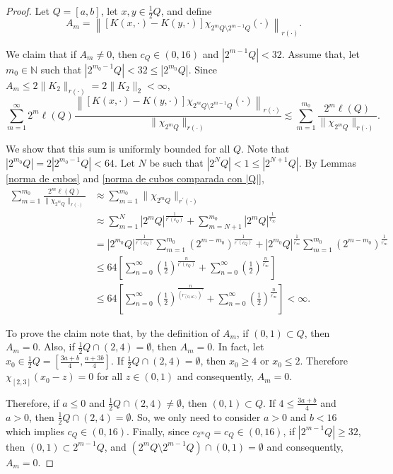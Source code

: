 \documentclass[a4paper,11pt,reqno]{amsart}
\theoremstyle{plain}
\numberwithin{equation}{section}
\theoremstyle{definition}
\begin{document}
\begin{proof}
	Let $Q=[a,b]$, let $x,y\in\frac{1}{2}Q$, and define $$A_m=\left\|\left[K(x,\cdot)-K(y,\cdot)\right]\chi_{2^mQ\setminus2^{m-1}Q}(\cdot)\right\|_{r(\cdot)}.$$
	
 	We claim that if $A_m\neq 0$, then $c_Q\in(0,16)$ and $|2^{m-1}Q|<32$. Assume that, let $m_0\in\mathbb{N}$ such that $|2^{m_0-1}Q|<32\leq|2^{m_0}Q|$. Since $A_m\leq2\|K_2\|_{r(\cdot)}=2\|K_2\|_2<\infty$,
	\begin{equation*}
	\sum_{m=1}^{\infty}2^m \ell(Q)\frac{\left\|\left[K(x,\cdot)-K(y,\cdot)\right]\chi_{2^mQ\setminus2^{m-1}Q}(\cdot)\right\|_{r(\cdot)}}{\|\chi_{2^m Q}\|_{r(\cdot)}}
	\lesssim \sum_{m=1}^{m_0}\frac{2^m \ell(Q)}{\|\chi_{2^m Q}\|_{r(\cdot)}}.
	\end{equation*} 
	
	We show that this sum is uniformly bounded for all $Q$. Note that $|2^{m_0}Q| = 2|2^{m_0-1}Q| < 64$. Let $N$ be such that $|2^NQ|<1\leq|2^{N+1}Q|$. By Lemmas \ref{norma de cubos} and \ref{norma de cubos comparada con |Q|},
	\begin{align*}\label{suma no depende del cubo Q}
	\sum_{m=1}^{m_0}\frac{2^m \ell(Q)}{\|\chi_{2^m Q}\|_{r(\cdot)}}&\approx\sum_{m=1}^{m_0}\|\chi_{2^m Q}\|_{r^\prime(\cdot)}\\
	&\approx \sum_{m=1}^{N}|2^mQ|^{\frac{1}{r^\prime\left(c_Q\right)}} + \sum_{m=N+1}^{m_0}|2^mQ|^{\frac{1}{r^\prime_\infty}}\\\
	&=|2^{m_0}Q|^{\frac{1}{r^\prime\left(c_Q\right)}}\sum_{m=1}^{m_0}(2^{m-m_0})^{\frac{1}{r^\prime\left(c_Q\right)}} + |2^{m_0}Q|^{\frac{1}{r^\prime_\infty}}\sum_{m=1}^{m_0}(2^{m-m_0})^{\frac{1}{r_\infty^\prime}}\\
	&\leq64\left[\sum_{n=0}^{\infty}\left(\frac{1}{2}\right)^{\frac{n}{r^\prime(c_Q)}} + \sum_{n=0}^{\infty}\left(\frac{1}{2}\right)^\frac{n}{r^\prime_\infty} \right]\\
	&\leq64\left[\sum_{n=0}^{\infty}\left(\frac{1}{2}\right)^{\frac{n}{\left(r^-_{(0,16)}\right)^\prime}} + \sum_{n=0}^{\infty}\left(\frac{1}{2}\right)^\frac{n}{r^\prime_\infty} \right]<\infty.
	\end{align*}


To prove the claim note that, by the definition of $A_m$, if $(0,1)\subset Q$, then $A_m=0$. Also, if $\frac{1}{2}Q\cap(2,4)=\emptyset$, then $A_m=0$. In fact, let $x_0\in\frac{1}{2}Q=\left[\frac{3a+b}{4},\frac{a+3b}{4}\right]$. If $\frac{1}{2}Q\cap(2,4)=\emptyset$, then $x_0\geq4$ or $x_0\leq2$. Therefore $\chi_{[2,3]}(x_0-z)=0$ for all $z\in(0,1)$ and consequently, $A_m=0$. 

Therefore, if $a\leq 0$ and $\frac{1}{2}Q\cap(2,4)\neq\emptyset$, then $(0,1)\subset Q$. If $4\leq\frac{3a+b}{4}$ and $a>0$, then $\frac{1}{2}Q\cap(2,4)=\emptyset$. So, we only need to consider $a>0$ and $b<16$ which implies $c_Q\in(0,16)$. Finally, since $c_{2^mQ}=c_Q\in (0,16)$, if $|2^{m-1}Q|\geq32$, then $(0,1)\subset 2^{m-1}Q$, and $(2^mQ\setminus2^{m-1}Q)\cap (0,1)=\emptyset$ and consequently, $A_m=0$.
\end{proof}	
\end{document}
